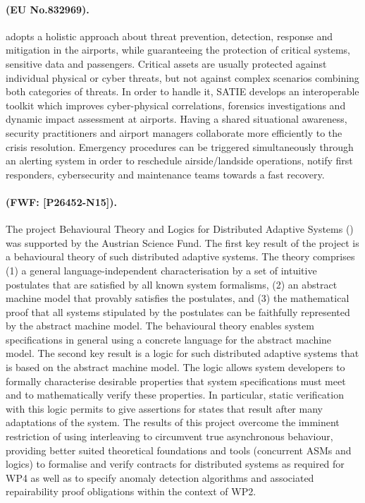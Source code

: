 \documentclass[a4paper,11pt]{article}
\begin{document}
\begin{mdframed}[backgroundcolor=blue!5]
\paragraph{\satie (EU No.832969).}
\satie adopts a holistic approach about threat prevention, detection, response and mitigation in the airports, while guaranteeing the protection of critical systems, sensitive data and passengers. Critical assets are usually protected against individual physical or cyber threats, but not against complex scenarios combining both categories of threats. In order to handle it, SATIE develops an interoperable toolkit which improves cyber-physical correlations, forensics investigations and dynamic impact assessment at airports. Having a shared situational awareness, security practitioners and airport managers collaborate more efficiently to the crisis resolution. Emergency procedures can be triggered simultaneously through an alerting system in order to reschedule airside/landside operations, notify first responders, cybersecurity and maintenance teams towards a fast recovery.
\end{mdframed}

\begin{mdframed}[backgroundcolor=blue!5]
\paragraph{\blogdas (FWF: [P26452-N15]).} 
The project Behavioural Theory and Logics for Distributed Adaptive Systems (\blogdas) was supported by the Austrian Science Fund. The first key result of the project is a behavioural theory of such distributed adaptive systems. The theory comprises (1) a general language-independent characterisation by a set of intuitive postulates that are satisfied by all known system formalisms, (2) an abstract machine model that provably satisfies the postulates, and (3) the mathematical proof that all systems stipulated by the postulates can be faithfully represented by the abstract machine model. The behavioural theory enables system specifications in general using a concrete language for the abstract machine model. The second key result is a logic for such distributed adaptive systems that is based on the abstract machine model. The logic allows system developers to formally characterise desirable properties that system specifications must meet and to mathematically verify these properties. In particular, static verification with this logic permits to give assertions for states that result after many adaptations of the system.
The results of this project overcome the imminent restriction of using interleaving to circumvent true asynchronous behaviour, providing better suited theoretical foundations and tools (concurrent ASMs and logics) to formalise and verify contracts for distributed systems as required for WP4 as well as to specify anomaly detection algorithms and associated repairability proof obligations within the context of WP2.  
\end{mdframed}
\end{document}
